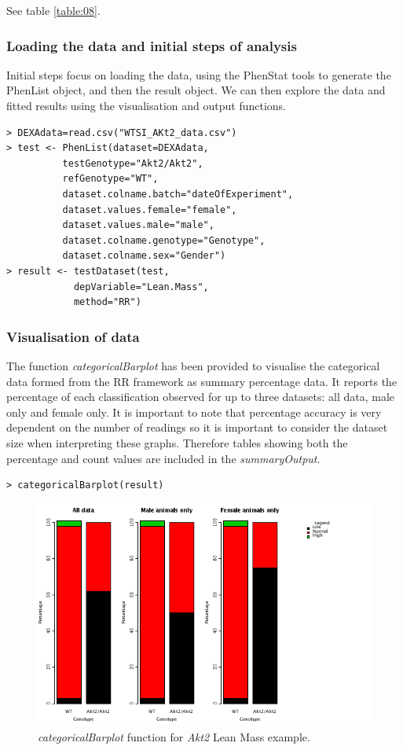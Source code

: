 \documentclass[12pt,a4paper]{article}
\begin{document}
See table \ref{table:08}.

\subsubsection{Loading the data and initial steps of analysis}
Initial steps focus on loading the data, using the PhenStat tools to generate the PhenList object, and then the result object. We can then explore the data and fitted results using the visualisation and output functions.
\begingroup
    \fontsize{8pt}{12pt}\selectfont
\begin{verbatim}
> DEXAdata=read.csv("WTSI_AKt2_data.csv")
> test <- PhenList(dataset=DEXAdata,
		  testGenotype="Akt2/Akt2",
		  refGenotype="WT",
		  dataset.colname.batch="dateOfExperiment",
		  dataset.values.female="female",
		  dataset.values.male="male", 
		  dataset.colname.genotype="Genotype", 
		  dataset.colname.sex="Gender")
> result <- testDataset(test, 
			depVariable="Lean.Mass", 
			method="RR")
\end{verbatim}
\endgroup 

\subsubsection{Visualisation of data}
The function \textit{categoricalBarplot} has been provided to visualise the categorical data formed from the RR framework as summary percentage data. It reports the percentage of each classification observed for up to three datasets: all data, male only and female only. It is important to note that percentage accuracy is very dependent on the number of readings so it is important to consider the dataset size when interpreting these graphs. Therefore tables showing both the percentage and count values are included in the \textit{summaryOutput}.
\begingroup
    \fontsize{8pt}{12pt}\selectfont
\begin{verbatim}
> categoricalBarplot(result)
\end{verbatim}
\endgroup 

\begin{figure}[H]%
\centerline{\includegraphics[scale=0.5]{RR_graph.png}}
\caption{\textit{categoricalBarplot} function for \textit{Akt2} Lean Mass example.}\label{fig:16a}
\end{figure}
\end{document}
